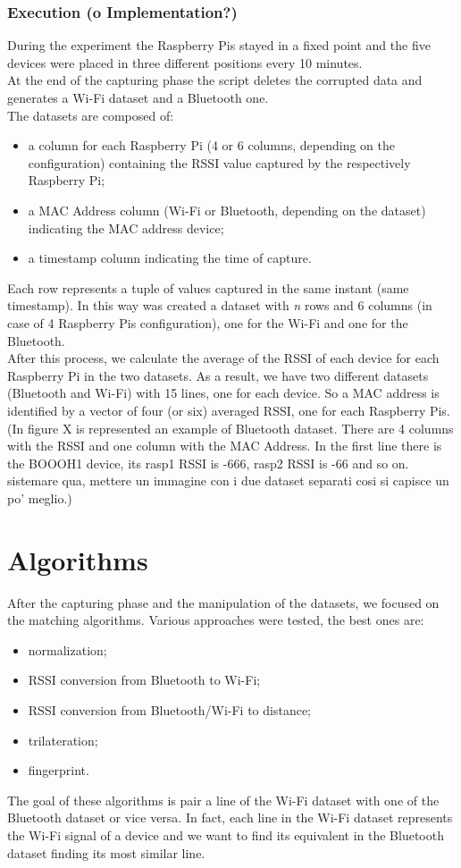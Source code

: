 \subsubsection{Execution (o Implementation?)}
During the experiment the Raspberry Pis stayed in a fixed point and the five devices were placed in three different positions every 10 minutes. \\
At the end of the capturing phase the script deletes the corrupted data and generates a Wi-Fi dataset and a Bluetooth one.\\
The datasets are composed of:
\begin{itemize}
\item a column for each Raspberry Pi (4 or 6 columns, depending on the configuration) containing the RSSI value captured by the respectively Raspberry Pi;
\item a MAC Address column (Wi-Fi or Bluetooth, depending on the dataset) indicating the MAC address device;
\item a timestamp column indicating the time of capture.
\end{itemize}
Each row represents a tuple of values captured in the same instant (same timestamp).
In this way was created a dataset with \textit{n} rows and 6 columns (in case of 4 Raspberry Pis configuration), one for the Wi-Fi and one for the Bluetooth.\\
\linebreak
After this process, we calculate the average of the RSSI of each device for each Raspberry Pi in the two datasets. As a result, we have two different datasets (Bluetooth and Wi-Fi) with 15 lines, one for each device. So a MAC address is identified by a vector of four (or six) averaged RSSI, one for each Raspberry Pis. (In figure X is represented an example of Bluetooth dataset. There are 4 columns with the RSSI and one column with the MAC Address. In the first line there is the BOOOH1 device, its rasp1 RSSI is -666, rasp2 RSSI is -66 and so on. sistemare qua, mettere un immagine con i due dataset separati cosi si capisce un po' meglio.)

\section{Algorithms}
After the capturing phase and the manipulation of the datasets, we focused on the matching algorithms. Various approaches were tested, the best ones are:
\begin{itemize}
\item normalization;
\item RSSI conversion from Bluetooth to Wi-Fi;
\item RSSI conversion from Bluetooth/Wi-Fi to distance;
\item trilateration;
\item fingerprint.
\end{itemize}
The goal of these algorithms is pair a line of the Wi-Fi dataset with one of the Bluetooth dataset or vice versa. In fact, each line in the Wi-Fi dataset represents the Wi-Fi signal of a device and we want to find its equivalent in the Bluetooth dataset finding its most similar line.

